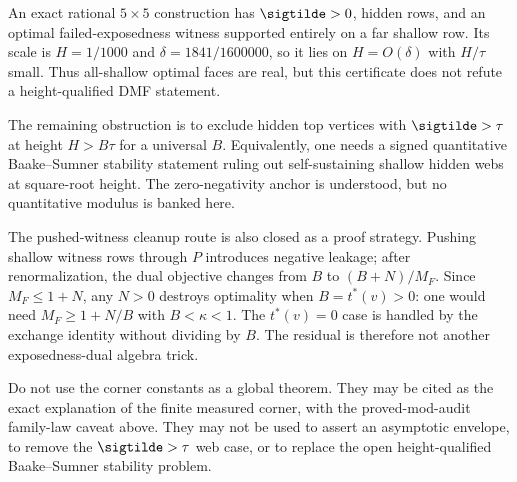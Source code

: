 \begin{remark}
\modauditbadge
An exact rational \(5\times5\) construction has \(\sigtilde>0\), hidden rows,
and an optimal failed-exposedness witness supported entirely on a far shallow
row.  Its scale is \(H=1/1000\) and
\(\delta=1841/1600000\), so it lies on \(H=O(\delta)\) with \(H/\tau\) small.
Thus all-shallow optimal faces are real, but this certificate does not refute a
height-qualified DMF statement.
\end{remark}

\begin{openproblem}
\openbadge
The remaining obstruction is to exclude hidden top vertices with
\(\sigtilde>\tau\) at height \(H>B\tau\) for a universal \(B\).  Equivalently,
one needs a signed quantitative Baake--Sumner stability statement ruling out
self-sustaining shallow hidden webs at square-root height.  The zero-negativity
anchor is understood, but no quantitative modulus is banked here.
\end{openproblem}

The pushed-witness cleanup route is also closed as a proof strategy.  Pushing
shallow witness rows through \(P\) introduces negative leakage; after
renormalization, the dual objective changes from \(B\) to \((B+N)/M_F\).  Since
\(M_F\le 1+N\), any \(N>0\) destroys optimality when \(B=t^*(v)>0\): one would
need \(M_F\ge 1+N/B\) with \(B<\kappa<1\).  The \(t^*(v)=0\) case is handled by
the exchange identity without dividing by \(B\).  The residual is therefore not
another exposedness-dual algebra trick.

\begin{warning}
\downgradedbadge
Do not use the corner constants as a global theorem.  They may be cited as the
exact explanation of the finite measured corner, with the proved-mod-audit
family-law caveat above.  They may not be used to assert an asymptotic envelope,
to remove the \(\sigtilde>\tau\) web case, or to replace the open
height-qualified Baake--Sumner stability problem.
\end{warning}
